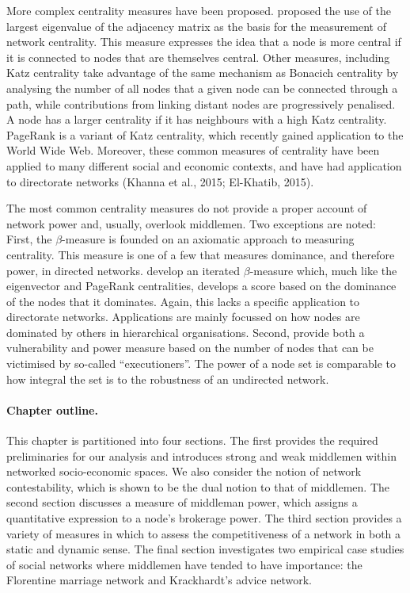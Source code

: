 More complex centrality measures have been proposed. \citet{Bonacich1972,Bonacich1987,Bonacich2001} proposed the use of the largest eigenvalue of the adjacency matrix as the basis for the measurement of network centrality. This measure expresses the idea that a node is more central if it is connected to nodes that are themselves central. Other measures, including Katz centrality \citep{Katz1953} take advantage of the same mechanism as Bonacich centrality by analysing the number of all nodes that a given node can be connected through a path, while contributions from linking distant nodes are progressively penalised. A node has a larger centrality if it has neighbours with a high Katz centrality. PageRank \citep{BrinPage1998} is a variant of Katz centrality, which recently gained application to the World Wide Web. Moreover, these common measures of centrality have been applied to many different social and economic contexts, and have had application to directorate networks (Khanna et al., 2015; El-Khatib, 2015).

The most common centrality measures do not provide a proper account of network power and, usually, overlook middlemen. Two exceptions are noted: First, the $\beta$-measure \citep{BrinkGilles1996, BrinkGilles2000} is founded on an axiomatic approach to measuring centrality. This measure is one of a few that measures dominance, and therefore power, in directed networks. \citet{BormBrink2002} develop an iterated $\beta$-measure which, much like the eigenvector and PageRank centralities, develops a score based on the dominance of the nodes that it dominates. Again, this lacks a specific application to directorate networks. Applications are mainly focussed on how nodes are dominated by others in hierarchical organisations. Second, \citet{Bozzo2015} provide both a vulnerability and power measure based on the number of nodes that can be victimised by so-called ``executioners''. The power of a node set is comparable to how integral the set is to the robustness of an undirected network.

\paragraph{Chapter outline.}

This chapter is partitioned into four sections. The first provides the required preliminaries for our analysis and introduces strong and weak middlemen within networked socio-economic spaces. We also consider the notion of network contestability, which is shown to be the dual notion to that of middlemen. The second section discusses a measure of middleman power, which assigns a quantitative expression to a node's brokerage power. The third section provides a variety of measures in which to assess the competitiveness of a network in both a static and dynamic sense. The final section investigates two empirical case studies of social networks where middlemen have tended to have importance: the Florentine marriage network and Krackhardt's advice network.

